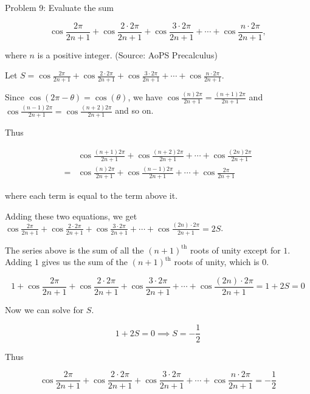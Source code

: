 Problem 9: Evaluate the sum

\[ \displaystyle \cos \frac{2\pi}{2n+1} + \cos \frac{2\cdot 2\pi}{2n+1} + \cos \frac{3\cdot 2\pi}{2n+1} + \cdots + \cos \frac{n\cdot 2\pi}{2n+1} , \]

where $n$ is a positive integer. (Source: AoPS Precalculus)

Let $\displaystyle S = \cos \frac{2\pi}{2n+1} + \cos \frac{2\cdot 2\pi}{2n+1} + \cos \frac{3\cdot 2\pi}{2n+1} + \cdots + \cos \frac{n\cdot 2\pi}{2n+1}$.

Since $\cos(2\pi - \theta) = \cos(\theta)$, we have $\displaystyle \cos \frac{(n)2\pi}{2n + 1} = \frac{(n+1)2\pi}{2n + 1}$ and $\displaystyle \cos \frac{(n-1)2\pi}{2n + 1} = \cos \frac{(n+2)2\pi}{2n + 1}$ and so on. 

Thus

\begin{align*}
&\cos \frac{(n+1)2\pi}{2n + 1} + \cos \frac{(n+2)2\pi}{2n + 1} + \cdots + \cos \frac{(2n)2\pi}{2n + 1} \\
= &\cos \frac{(n)2\pi}{2n + 1} + \cos \frac{(n-1)2\pi}{2n + 1} + \cdots + \cos \frac{2\pi}{2n + 1}
\end{align*}

where each term is equal to the term above it.

Adding these two equations, we get $\displaystyle \cos \frac{2\pi}{2n+1} + \cos \frac{2\cdot 2\pi}{2n+1} + \cos \frac{3\cdot 2\pi}{2n+1} + \cdots + \cos \frac{(2n) \cdot 2\pi}{2n+1} = 2S$.

The series above is the sum of all the $(n+1)^{\text{th}}$ roots of unity except for $1$. Adding $1$ gives us the sum of the $(n+1)^{\text{th}}$ roots of unity, which is $0$.

$$ 1 + \cos \frac{2\pi}{2n+1} + \cos \frac{2\cdot 2\pi}{2n+1} + \cos \frac{3\cdot 2\pi}{2n+1} + \cdots + \cos \frac{(2n) \cdot 2\pi}{2n+1} = 1 + 2S = 0 $$

Now we can solve for $S$.

$$ 1 + 2S = 0 \implies S = -\frac{1}{2} $$

Thus

$$ \boxed{\cos \frac{2\pi}{2n+1} + \cos \frac{2\cdot 2\pi}{2n+1} + \cos \frac{3\cdot 2\pi}{2n+1} + \cdots + \cos \frac{n\cdot 2\pi}{2n+1} = -\frac{1}{2}} $$
